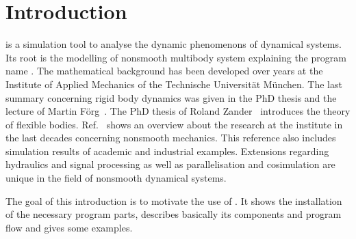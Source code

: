 \section{Introduction}
\MBSim{} is a simulation tool to analyse the dynamic phenomenons of dynamical systems. Its root is the modelling of nonsmooth multibody system explaining the program name \MBSim{}. The mathematical background has been developed over years at the Institute of Applied Mechanics of the Technische Universit\"at M\"unchen. The last summary concerning rigid body dynamics was given in the PhD thesis and the lecture of Martin F\"org~\cite{Foer06,Foer07}. The PhD thesis of Roland Zander~\cite{Zan08a} introduces the theory of flexible bodies. Ref.~\cite{Zan08} shows an overview about the research at the institute in the last decades concerning nonsmooth mechanics. This reference also includes simulation results of academic and industrial examples. Extensions regarding hydraulics and signal processing as well as parallelisation and cosimulation are unique in the field of nonsmooth dynamical systems.\par
The goal of this introduction is to motivate the use of \MBSim{}. It shows the installation of the necessary program parts, describes basically its components and program flow and gives some examples. 

